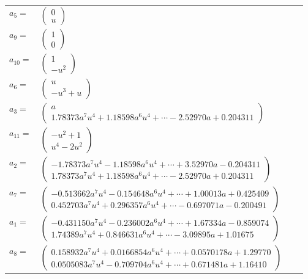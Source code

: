 \documentclass[1p]{elsarticle_modified}
\theoremstyle{definition}
\begin{document}
\begin{tabular}{m{7pt} m{180pt} m{7pt} m{180pt} }
\flushright $a_{5}=$&$\begin{pmatrix}0\\u\end{pmatrix}$ \\
\flushright $a_{9}=$&$\begin{pmatrix}1\\0\end{pmatrix}$ \\
\flushright $a_{10}=$&$\begin{pmatrix}1\\- u^2\end{pmatrix}$ \\
\flushright $a_{6}=$&$\begin{pmatrix}u\\- u^3+u\end{pmatrix}$ \\
\flushright $a_{3}=$&$\begin{pmatrix}a\\1.78373 a^{7} u^{4}+1.18598 a^{6} u^{4}+\cdots-2.52970 a+0.204311\end{pmatrix}$ \\
\flushright $a_{11}=$&$\begin{pmatrix}- u^2+1\\u^4-2 u^2\end{pmatrix}$ \\
\flushright $a_{2}=$&$\begin{pmatrix}-1.78373 a^{7} u^{4}-1.18598 a^{6} u^{4}+\cdots+3.52970 a-0.204311\\1.78373 a^{7} u^{4}+1.18598 a^{6} u^{4}+\cdots-2.52970 a+0.204311\end{pmatrix}$ \\
\flushright $a_{7}=$&$\begin{pmatrix}-0.513662 a^{7} u^{4}-0.154648 a^{6} u^{4}+\cdots+1.00013 a+0.425409\\0.452703 a^{7} u^{4}+0.296357 a^{6} u^{4}+\cdots-0.697071 a-0.200491\end{pmatrix}$ \\
\flushright $a_{1}=$&$\begin{pmatrix}-0.431150 a^{7} u^{4}-0.236002 a^{6} u^{4}+\cdots+1.67334 a-0.859074\\1.74389 a^{7} u^{4}+0.846631 a^{6} u^{4}+\cdots-3.09895 a+1.01675\end{pmatrix}$ \\
\flushright $a_{8}=$&$\begin{pmatrix}0.158932 a^{7} u^{4}+0.0166854 a^{6} u^{4}+\cdots+0.0570178 a+1.29770\\0.0505083 a^{7} u^{4}-0.709704 a^{6} u^{4}+\cdots+0.671481 a+1.16410\end{pmatrix}$ \\

\end{tabular}
\end{document}
